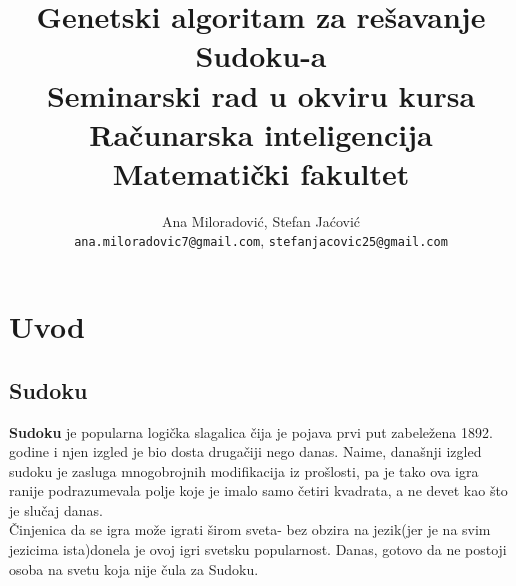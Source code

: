 \documentclass[a4paper]{article}
\begin{document}
\title{Genetski algoritam za rešavanje Sudoku-a\\
\vspace{5mm}
\small{Seminarski rad u okviru kursa\\Računarska inteligencija\\ Matematički fakultet}}

\author{Ana Miloradović, Stefan Jaćović\protect\\
\small{\texttt{ana.miloradovic7@gmail.com},} \texttt{stefanjacovic25@gmail.com}}



\maketitle


\tableofcontents

\newpage

\section{Uvod}

\subsection{Sudoku}
\textbf{Sudoku} je popularna logička slagalica čija je pojava prvi put zabeležena  1892. godine i njen izgled je bio dosta drugačiji nego danas. Naime, današnji izgled sudoku je zasluga mnogobrojnih modifikacija iz prošlosti, pa je tako ova igra ranije podrazumevala polje koje je imalo samo četiri kvadrata, a ne devet kao što je slučaj danas.\\
Činjenica da se igra može igrati širom sveta- bez obzira na jezik(jer je na svim jezicima ista)donela  je ovoj igri svetsku popularnost. Danas, gotovo da ne postoji osoba na svetu koja nije čula za Sudoku. 
\end{document}
